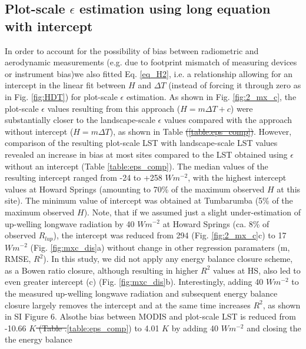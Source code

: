 \documentclass[fleqn,10pt]{wlscirep}
\providecommand{\DIFaddtex}[1]{{\protect\color{blue}\uwave{#1}}} %
\providecommand{\DIFdeltex}[1]{{\protect\color{red}\sout{#1}}}                      %
\providecommand{\DIFaddbegin}{} %
\providecommand{\DIFaddend}{} %
\providecommand{\DIFdelbegin}{} %
\providecommand{\DIFdelend}{} %
\providecommand{\DIFadd}[1]{\texorpdfstring{\DIFaddtex{#1}}{#1}} %
\providecommand{\DIFdel}[1]{\texorpdfstring{\DIFdeltex{#1}}{}} %
\begin{document}
\subsection{Plot-scale $\epsilon$ estimation using long equation with intercept}
In order to account for the possibility of bias between radiometric and aerodynamic measurements (e.g. due to footprint mismatch of measuring devices or instrument bias)\DIFaddbegin \DIFadd{, }\DIFaddend we also fitted Eq. \ref{eq_H2}, i.e. a relationship allowing for an intercept in the linear fit between $H$ and $\Delta T$ (instead of forcing it through zero as in Fig. \ref{fig:HDT}) for plot-scale $\epsilon$ estimation. As shown in Fig. \ref{fig:2_mx_c}, the plot-scale $\epsilon$ values resulting from this approach ($H=m \Delta T + c$) were substantially closer to the landscape-scale $\epsilon$ values compared with the approach without intercept ($H=m \Delta T$), as shown in Table \DIFdelbegin \DIFdel{(\ref{table:eps_comp})}\DIFdelend \DIFaddbegin \DIFadd{\ref{table:eps_comp}}\DIFaddend . However, comparison of the resulting plot-scale LST with landscape-scale LST values revealed an increase in bias at most sites compared to the LST obtained using \DIFdelbegin \DIFdel{$\epsilon$ }\DIFdelend \DIFaddbegin \DIFadd{$\epsilon_{plot}$ }\DIFaddend without an intercept (Table \ref{table:eps_comp}). The median values of the resulting intercept ranged from -24 to +258 $Wm^{-2}$, with the highest intercept values at Howard Springs (amounting to 70\% of the maximum observed $H$ at this site). The minimum value of intercept was obtained at Tumbarumba (5\% of the maximum observed $H$). Note, that if we assumed just a slight under-estimation of up-welling longwave radiation by 40 $Wm^{-2}$ at Howard Springs (ca. 8\% of observed $R_{lup}$), the intercept was reduced from 294 (Fig. \ref{fig:2_mx_c}c) to 17 $Wm^{-2}$ (Fig. \ref{fig:mxc_dis}a) without change in other regression paramaters (m, RMSE, $R^{2}$). In this study, we did not apply any energy balance closure scheme, as a Bowen ratio closure, although resulting in higher $R^{2}$ values at HS, also led to even greater intercept (c) (Fig. \ref{fig:mxc_dis}b). Interestingly, adding 40 $Wm^{-2}$ to the  measured up-welling longwave radiation and subsequent energy balance closure largely removes the intercept and at the same time increases $R^2$, as shown in SI Figure 6. Also\DIFaddbegin \DIFadd{, }\DIFaddend the bias between MODIS and plot-scale LST is reduced from -10.66 \DIFdelbegin \DIFdel{$K$ (Table .}\DIFdelend \DIFaddbegin \DIFadd{K (Table }\DIFaddend \ref{table:eps_comp}) to 4.01 $K$ by adding 40 $Wm^{-2}$ and closing the the energy balance\DIFaddbegin \DIFadd{. 
}\DIFaddend 
\end{document}
